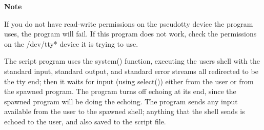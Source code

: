 {\sffamily\bfseries
Note}

{\sffamily
If you do not have read-write permissions on the pseudotty device the
program uses, the program will fail. If this program does not work,
check the permissions on the /dev/tty* device it is trying to use. }

The \textsf{script} program uses the \textsf{system()}
function, executing the user{\textquotesingle}s shell with the standard
input, standard output, and standard error streams all redirected to be
the tty end; then it waits for input (using
\textsf{select()}) either from the user or from the
spawned program. The program turns off echoing at its end, since the
spawned program will be doing the echoing. The program sends any input
available from the user to the spawned shell; anything that the shell
sends is echoed to the user, and also saved to the script file. 



